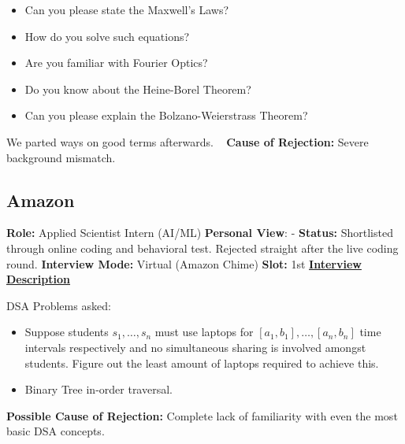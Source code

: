 \documentclass[12pt]{article}
\begin{document}
\begin{itemize}
    \item Can you please state the Maxwell's Laws?
    \item How do you solve such equations?
    \item Are you familiar with Fourier Optics?
    \item Do you know about the Heine-Borel Theorem?
    \item Can you please explain the Bolzano-Weierstrass Theorem?
\end{itemize}

We parted ways on good terms afterwards.
\newline
\vspace{1pt}\
\newline
\textbf{Cause of Rejection:} Severe background mismatch.



\subsection{Amazon}

\textbf{Role:} Applied Scientist Intern (AI/ML)
\newline
\textbf{Personal View}: -
\newline
\textbf{Status:} Shortlisted through online coding and behavioral test. Rejected straight after the live coding round.
\newline
\textbf{Interview Mode:} Virtual (Amazon Chime)
\newline
\textbf{Slot:} 1st
\newline
\vspace{10pt}
\newline
\underline{\textbf{Interview Description}}
\newline

DSA Problems asked:
\begin{itemize}
    \item Suppose students $s_1, \dots, s_n$ must use laptops for $[a_1, b_1], \dots, [a_n, b_n]$ time intervals respectively and no simultaneous sharing is involved amongst students. Figure out the least amount of laptops required to achieve this.
    \item Binary Tree in-order traversal.
\end{itemize}

\textbf{Possible Cause of Rejection:} Complete lack of familiarity with even the most basic DSA concepts. 
\end{document}
